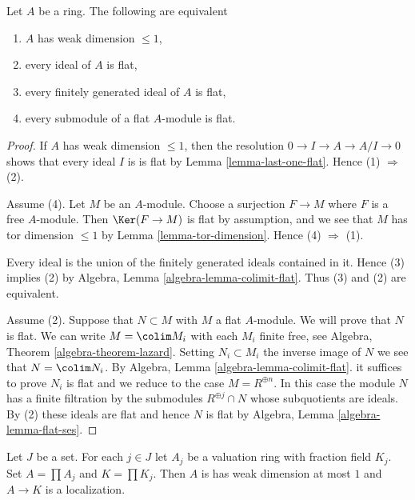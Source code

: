 \begin{lemma}
\label{lemma-weak-dimension-at-most-1}
Let $A$ be a ring. The following are equivalent
\begin{enumerate}
\item $A$ has weak dimension $\leq 1$,
\item every ideal of $A$ is flat,
\item every finitely generated ideal of $A$ is flat,
\item every submodule of a flat $A$-module is flat.
\end{enumerate}
\end{lemma}

\begin{proof}
If $A$ has weak dimension $\leq 1$, then the resolution
$0 \to I \to A \to A/I \to 0$ shows that every ideal $I$ is
is flat by Lemma \ref{lemma-last-one-flat}.
Hence (1) $\Rightarrow$ (2).

\medskip\noindent
Assume (4). Let $M$ be an $A$-module. Choose a surjection
$F \to M$ where $F$ is a free $A$-module. Then $\Ker(F \to M)$
is flat by assumption, and we see that $M$ has tor dimension
$\leq 1$ by Lemma \ref{lemma-tor-dimension}.
Hence (4) $\Rightarrow$ (1).

\medskip\noindent
Every ideal is the union of the finitely generated ideals
contained in it. Hence (3) implies (2) by
Algebra, Lemma \ref{algebra-lemma-colimit-flat}.
Thus (3) and (2) are equivalent.

\medskip\noindent
Assume (2). Suppose that $N \subset M$ with $M$ a flat $A$-module.
We will prove that $N$ is flat.
We can write $M = \colim M_i$ with each $M_i$ finite free, see
Algebra, Theorem \ref{algebra-theorem-lazard}.
Setting $N_i \subset M_i$ the inverse image of $N$ we see that
$N = \colim N_i$. By
Algebra, Lemma \ref{algebra-lemma-colimit-flat}.
it suffices to prove $N_i$ is flat and we reduce
to the case $M = R^{\oplus n}$. In this case
the module $N$ has a finite filtration by the submodules
$R^{\oplus j} \cap N$ whose subquotients are ideals.
By (2) these ideals are flat and hence $N$ is flat by
Algebra, Lemma \ref{algebra-lemma-flat-ses}.
\end{proof}

\begin{lemma}
\label{lemma-product-weak-dimension-at-most-1}
Let $J$ be a set. For each $j \in J$ let
$A_j$ be a valuation ring with fraction field $K_j$.
Set $A = \prod A_j$ and $K = \prod K_j$.
Then $A$ is has weak dimension at most $1$ and $A \to K$ is
a localization.
\end{lemma}

